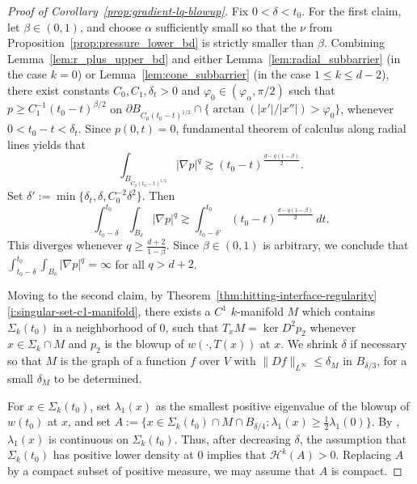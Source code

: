 \documentclass[11pt]{amsart}
\numberwithin{equation}{section}
\numberwithin{figure}{section}
\theoremstyle{plain}
\theoremstyle{definition}
\theoremstyle{remark}
\theoremstyle{plain}
\begin{document}
\begin{proof}[Proof of Corollary~\ref{prop:gradient-lq-blowup}]

    Fix $0<\delta<t_0$. For the first claim, let $\beta\in (0,1)$, and choose $\alpha$ sufficiently small so that the $\nu$ from Proposition~\ref{prop:pressure_lower_bd} is strictly smaller than $\beta$. Combining Lemma~\ref{lem:r_plus_upper_bd} and either Lemma~\ref{lem:radial_subbarrier} (in the case $k=0$) or Lemma~\ref{lem:cone_subbarrier} (in the case $1\leq k \leq d-2$), there exist constants $C_0, C_1, \delta_t > 0$ and $\varphi_0\in (\varphi_\alpha, \pi/2)$ such that $p\geq C_1^{-1}(t_0 - t)^{\beta/2}$ on $\partial B_{C_0(t_0-t)^{1/2}}\cap \{ \arctan(|x'|/|x''|) > \varphi_0\}$, whenever $0 < t_0 - t < \delta_t$. Since $p(0, t) = 0$, fundamental theorem of calculus along radial lines yields that
    \[ \int_{B_{C_0(t_0-t)^{1/2}}} |\nabla p|^q \gtrsim (t_0 - t)^{\tfrac{d - q(1-\beta)}{2}}.  \]
    Set $\delta':=\min\{\delta_t,\delta,C_0^{-2}\delta^2\}$. Then
    \[
    \int_{t_0-\delta}^{t_0}\int_{B_{\delta}}|\nabla p|^q
    \gtrsim
    \int_{t_0-\delta'}^{t_0}
    (t_0-t)^{\tfrac{d-q(1-\beta)}2}\,dt.
    \]
    This diverges whenever $q \geq \frac{d+2}{1-\beta}$. Since $\beta\in (0,1)$ is arbitrary, we conclude that $\int_{t_0-\delta}^{t_0}\int_{B_{\delta}} |\nabla p|^q = \infty$ for all $q > d + 2$.
    
    Moving to the second claim, by Theorem~\ref{thm:hitting-interface-regularity}\ref{i:singular-set-c1-manifold}, there exists a $C^1$ $k$-manifold $M$ which contains $\Sigma_k(t_0)$ in a neighborhood of 0, such that $T_xM = \ker D^2 p_2$ whenever $x\in \Sigma_k\cap M$ and $p_2$ is the blowup of $w(\cdot, T(x))$ at $x$. We shrink $\delta$ if necessary so that $M$ is the graph of a function $f$ over $V$ with $\|Df\|_{L^\infty} \leq \delta_M$ in $B_{\delta/3}$, for a small $\delta_M$ to be determined.
    
    For $x\in \Sigma_k(t_0)$, set $\lambda_1(x)$ as the smallest positive eigenvalue of the blowup of $w(t_0)$ at $x$, and set $A := \{x \in \Sigma_k(t_0)\cap M\cap B_{\delta/4} : \lambda_1(x) \geq \frac{1}{2}\lambda_1(0)\}$. By \cite[Proposition 5.13]{CJK25}, $\lambda_1(x)$ is continuous on $\Sigma_k(t_0)$. Thus, after decreasing $\delta$, the assumption that $\Sigma_k(t_0)$ has positive lower density at 0 implies that $\mathcal{H}^k(A) > 0$. Replacing $A$ by a compact subset of positive measure, we may assume that $A$ is compact.


\end{proof}
\end{document}
